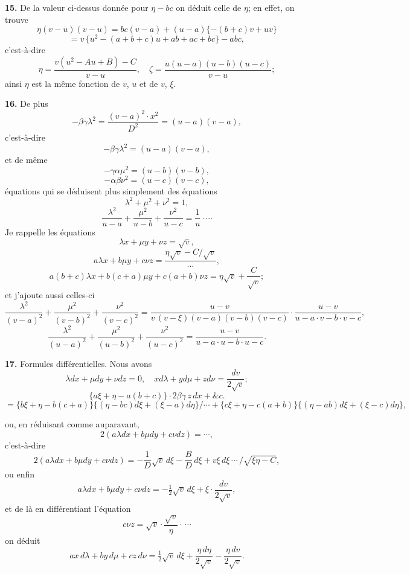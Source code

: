 \documentclass[11pt,a4paper]{article}
\begin{document}
\textbf{15.} De la valeur ci-dessus donn\'ee pour $\eta - bc$ on d\'eduit celle de $\eta$; en effet, on trouve
\[
\eta(v - u)(v - u) = bc(v - a) + (u - a)\{-(b + c)v + uv\}
\]
\[
= v\,\{u^2 - (a + b + c)u + ab + ac + bc\} - abc,
\]
c'est-\`a-dire
\[
\eta = \frac{v(u^2 - Au + B) - C}{v - u},\quad \zeta = \frac{u(u - a)(u - b)(u - c)}{v - u};
\]
ainsi $\eta$ est la m\^eme fonction de $v$, $u$ et de $v$, $\xi$.

\textbf{16.} De plus
\[
-\beta\gamma\lambda^2 = \frac{(v - a)^2 \cdot x^2}{D^2} = (u - a)(v - a),
\]
c'est-\`a-dire
\[
-\beta\gamma\lambda^2 = (u - a)(v - a),
\]
et de m\^eme
\[
-\gamma\alpha\mu^2 = (u - b)(v - b),
\]
\[
-\alpha\beta\nu^2 = (u - c)(v - c),
\]
\'equations qui se d\'eduisent plus simplement des \'equations
\[
\lambda^2 + \mu^2 + \nu^2 = 1,
\]
\[
\frac{\lambda^2}{u - a} + \frac{\mu^2}{u - b} + \frac{\nu^2}{u - c} = \frac{1}{u}\cdot\cdots
\]
Je rappelle les \'equations
\[
\lambda x + \mu y + \nu z = \sqrt{v},
\]
\[
a\lambda x + b\mu y + c\nu z = \frac{\eta\sqrt{v} - C/\sqrt{v}}{\cdots},
\]
\[
a(b + c)\lambda x + b(c + a)\mu y + c(a + b)\nu z = \eta\sqrt{v} + \frac{C}{\sqrt{v}};
\]
et j'ajoute aussi celles-ci
\[
\frac{\lambda^2}{(v - a)^2} + \frac{\mu^2}{(v - b)^2} + \frac{\nu^2}{(v - c)^2} = \frac{u - v}{v\,(v - \xi)(v - a)(v - b)(v - c)} \cdot \frac{u - v}{u - a\cdot v - b\cdot v - c},
\]
\[
\frac{\lambda^2}{(u - a)^2} + \frac{\mu^2}{(u - b)^2} + \frac{\nu^2}{(u - c)^2} = \frac{u - v}{u - a\cdot u - b\cdot u - c}.
\]

\textbf{17.} Formules diff\'erentielles. Nous avons
\[
\lambda dx + \mu dy + \nu dz = 0,\quad x d\lambda + y d\mu + z d\nu = \frac{dv}{2\sqrt{v}};
\]
\[
\{a\xi + \eta - a(b + c)\}\cdot 2\beta\gamma\,z\,dx + \&c.
\]
\[
= \{b\xi + \eta - b(c + a)\}\{(\eta - bc)d\xi + (\xi - a)d\eta\}/\cdots + \{c\xi + \eta - c(a + b)\}\{(\eta - ab)d\xi + (\xi - c)d\eta\},
\]

ou, en r\'eduisant comme auparavant,
\[
2(a\lambda dx + b\mu dy + c\nu dz) = \cdots,
\]
c'est-\`a-dire
\[
2(a\lambda dx + b\mu dy + c\nu dz) = -\frac{1}{D}\sqrt{v}\,d\xi - \frac{B}{D}\,d\xi + v\xi\,d\xi\,\cdots\,/\sqrt{\xi\eta - C},
\]
ou enfin
\[
a\lambda dx + b\mu dy + c\nu dz = -\tfrac{1}{2}\sqrt{v}\,d\xi + \xi\cdot\frac{dv}{2\sqrt{v}},
\]
et de l\`a en diff\'erentiant l'\'equation
\[
c\nu z = \sqrt{v}\cdot\frac{\sqrt{v}}{\eta}\cdot\,\cdots
\]
on d\'eduit
\[
a x\,d\lambda + b y\,d\mu + c z\,d\nu = \tfrac{1}{2}\sqrt{v}\,d\xi + \frac{\eta\,d\eta}{2\sqrt{v}} - \frac{\eta\,dv}{2\sqrt{v}}.
\]
\end{document}
